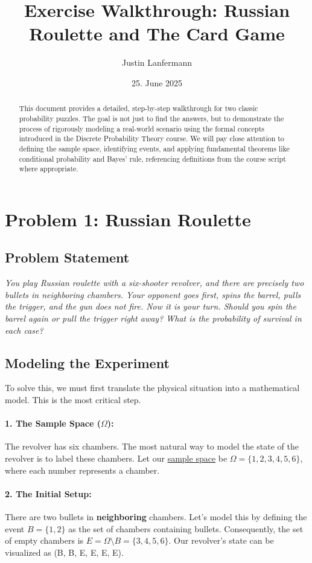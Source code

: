 \documentclass[11pt,a4paper]{article}
\title{Exercise Walkthrough: Russian Roulette and The Card Game}
\author{Justin Lanfermann}
\date{25. June 2025}
\theoremstyle{tutorstyle}
\newcommand{\concept}[2]{\hyperlink{#1}{#2}}
\begin{document}
\maketitle

\begin{abstract}
This document provides a detailed, step-by-step walkthrough for two classic probability puzzles. The goal is not just to find the answers, but to demonstrate the process of rigorously modeling a real-world scenario using the formal concepts introduced in the Discrete Probability Theory course. We will pay close attention to defining the sample space, identifying events, and applying fundamental theorems like conditional probability and Bayes' rule, referencing definitions from the course script where appropriate.
\end{abstract}

\section{Problem 1: Russian Roulette}

\subsection{Problem Statement}
\textit{You play Russian roulette with a six-shooter revolver, and there are precisely two bullets in neighboring chambers. Your opponent goes first, spins the barrel, pulls the trigger, and the gun does not fire. Now it is your turn. Should you spin the barrel again or pull the trigger right away? What is the probability of survival in each case?}

\subsection{Modeling the Experiment}
To solve this, we must first translate the physical situation into a mathematical model. This is the most critical step.

\paragraph{1. The Sample Space ($\Omega$):}
The revolver has six chambers. The most natural way to model the state of the revolver is to label these chambers. Let our \concept{concept_space}{sample space} be $\Omega = \{1, 2, 3, 4, 5, 6\}$, where each number represents a chamber.

\paragraph{2. The Initial Setup:}
There are two bullets in \textbf{neighboring} chambers. Let's model this by defining the event $B = \{1, 2\}$ as the set of chambers containing bullets. Consequently, the set of empty chambers is $E = \Omega \setminus B = \{3, 4, 5, 6\}$. Our revolver's state can be visualized as (B, B, E, E, E, E).
\end{document}
